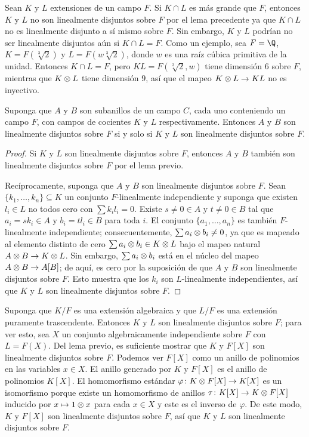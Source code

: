 \begin{example}
  Sean $K$ y $L$ extensiones de un campo $F$. Si $K\cap L$ es más grande que $F$, entonces $K$ y $L$ no son linealmente disjuntos sobre $F$ por el lema precedente ya que $K\cap L$ no es linealmente disjunto a sí mismo sobre $F$. Sin embargo, $K$ y $L$ podrían no ser linealmente disjuntos aún si $K\cap L=F$. Como un ejemplo, sea $F=\Q$, $K=F(\sqrt[3]{2}) $ y $L=F(  w\sqrt[3]{2})  $, donde $w$ es una raíz cúbica primitiva de la unidad. Entonces $K\cap L=F$, pero $KL=F(\sqrt[3]{2}, w)$ tiene dimensión $6$ sobre $F$, mientras  que $K \otimes L$ tiene dimensión $9$, así que el mapeo $K\otimes L\to KL$ no es inyectivo.
\end{example}

\begin{lemma}
  Suponga que $A$ y $B$ son subanillos de un campo $C$, cada uno conteniendo un campo $F$, con campos de cocientes $K$ y $L$ respectivamente. Entonces $A$ y $B$ son linealmente disjuntos sobre $F$ si y solo si $K$ y $L$ son linealmente disjuntos sobre $F$.
\end{lemma}
\begin{proof}
  Si $K$ y $L$ son linealmente disjuntos sobre $F$, entonces $A$ y $B$ también son linealmente disjuntos sobre $F$ por el lema previo. 
  
  Recíprocamente, suponga que $A$ y $B$ son linealmente disjuntos sobre $F$. Sean $\{  k_1, \ldots, k_n\}  \subseteq K$ un conjunto $F$-linealmente independiente y suponga que existen $l_i\in L$ no todos cero con $\sum k_i l_i = 0$. Existe $s \neq 0 \in A$ y $t \neq 0 \in B$ tal que $a_i = sk_i \in A$ y $b_i = t l_i \in B$ para toda $i$. El conjunto $\{ a_1, \ldots, a_n \} $ es también $F$-linealmente independiente; consecuentemente, $\sum a_i \otimes b_i \neq 0$, ya que es mapeado al elemento distinto de cero $\sum a_i \otimes b_i \in K \otimes L$ bajo el mapeo natural $A \otimes B \to K \otimes L$. Sin embargo, $\sum a_i \otimes b_i$ está en el núcleo del mapeo $A \otimes B \to A[B]$; de aquí, es cero por la suposición de que $A$ y $B$ son linealmente disjuntos sobre $F$. Esto muestra que los $k_i$ son $L$-linealmente independientes, así que $K$ y $L$ son linealmente disjuntos sobre $F$.
\end{proof}

\begin{example}\label{exam:5.34}
  Suponga que $K/F$ es una extensión algebraica y que $L/F$ es una extensión puramente trascendente. Entonces $K$ y $L$ son linealmente disjuntos sobre $F$; para ver esto, sea $X$ un conjunto algebraicamente independiente sobre $F$ con $L=F(X)$. Del lema previo, es suficiente mostrar que $K$ y $F[X]$ son linealmente disjuntos sobre $F$. Podemos ver $F[X]  $ como un anillo de polinomios en las variables $x \in X$. El anillo generado por $K$ y $F[X]$ es el anillo de polinomios $K[X]$. El homomorfismo estándar $\varphi\colon K \otimes F[X]  \to K[X]$ es un isomorfismo porque existe un homomorfismo de anillos $\tau\colon K[X] \to K \otimes F[X]$ inducido por $x\mapsto 1 \otimes x$ para cada $x\in X$ y este es el inverso de $\varphi$. De este modo, $K$ y $F[X]$ son linealmente disjuntos sobre $F$, así que $K$ y $L$ son linealmente disjuntos sobre $F$.
\end{example}

